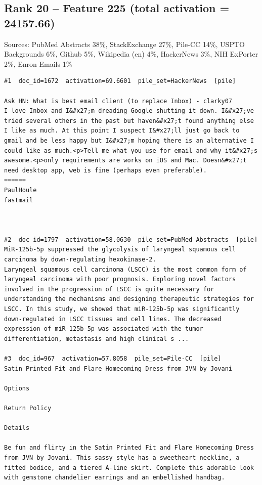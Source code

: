 \subsection*{Rank 20 -- Feature 225 (total activation = 24157.66)}

Sources: PubMed Abstracts 38\%, StackExchange 27\%, Pile-CC 14\%, USPTO Backgrounds 6\%, Github 5\%, Wikipedia (en) 4\%, HackerNews 3\%, NIH ExPorter 2\%, Enron Emails 1\%

\begin{verbatim}
#1  doc_id=1672  activation=69.6601  pile_set=HackerNews  [pile]

Ask HN: What is best email client (to replace Inbox) - clarky07
I love Inbox and I&#x27;m dreading Google shutting it down. I&#x27;ve tried several others in the past but haven&#x27;t found anything else I like as much. At this point I suspect I&#x27;ll just go back to gmail and be less happy but I&#x27;m hoping there is an alternative I could like as much.<p>Tell me what you use for email and why it&#x27;s awesome.<p>only requirements are works on iOS and Mac. Doesn&#x27;t need desktop app, web is fine (perhaps even preferable).
======
PaulHoule
fastmail



#2  doc_id=1797  activation=58.0630  pile_set=PubMed Abstracts  [pile]
MiR-125b-5p suppressed the glycolysis of laryngeal squamous cell carcinoma by down-regulating hexokinase-2.
Laryngeal squamous cell carcinoma (LSCC) is the most common form of laryngeal carcinoma with poor prognosis. Exploring novel factors involved in the progression of LSCC is quite necessary for understanding the mechanisms and designing therapeutic strategies for LSCC. In this study, we showed that miR-125b-5p was significantly down-regulated in LSCC tissues and cell lines. The decreased expression of miR-125b-5p was associated with the tumor differentiation, metastasis and high clinical s ...

#3  doc_id=967  activation=57.8058  pile_set=Pile-CC  [pile]
Satin Printed Fit and Flare Homecoming Dress from JVN by Jovani

Options

Return Policy

Details

Be fun and flirty in the Satin Printed Fit and Flare Homecoming Dress from JVN by Jovani. This sassy style has a sweetheart neckline, a fitted bodice, and a tiered A-line skirt. Complete this adorable look with gemstone chandelier earrings and an embellished handbag.


\end{verbatim}
